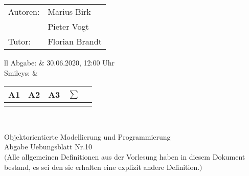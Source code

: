 \documentclass[12pt,a4paper,oneside,ngerman]{article}
\newcommand{\fach}{Objektorientierte Modellierung und Programmierung}
\newcommand{\dokumentenTitel}{Abgabe Uebungsblatt Nr.10}
\newcommand{\Abgabe}{30.06.2020, 12:00 Uhr}
\newcommand{\memberOne}{Marius Birk}
\newcommand{\memberTwo}{Pieter Vogt}
\newcommand{\tutor}{ Florian Brandt }
\begin{document}
	\thispagestyle{plain} %
	
	\begin{multicols}{2} %
		\hspace{-1cm} %
		\begin{tabular}{ll} %
			Autoren: & \memberOne \\ %
			& \memberTwo \\
			Tutor: & \tutor \\  
		\end{tabular}
		
		\columnbreak %
		\hspace{-1cm} %
		\begin{tabular}{ll} %
			Abgabe: & \Abgabe \\ %
			Smileys: &  
			\renewcommand{\arraystretch}{1.2} 
			\begin{tabular}{|p{0.8cm}|p{0.8cm}|p{0.8cm}|p{0.8cm}|p{0.8cm}|}
				\hline A1 & A2 & A3 &$\sum\limits^{ }$ \\ \hline
				& & & \\ \hline    
			\end{tabular} \\
		\end{tabular}
		
	\end{multicols} %
	
	\begin{center}
		\Large{\fach} \\
		\LARGE{\dokumentenTitel} \\
		\small
		$($Alle allgemeinen Definitionen aus der Vorlesung haben in diesem Dokument bestand, es sei den sie erhalten eine explizit andere Definition.$)$
	\end{center}
\end{document}
